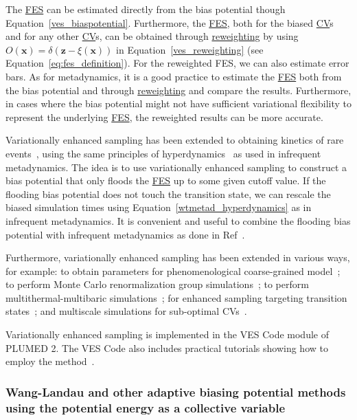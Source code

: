 \documentclass[9pt,review]{livecoms}
\newcommand{\vx}{\mathbf{x}}
\newcommand{\vz}{\mathbf{z}}
\begin{document}
The \hyperlink{ref:FES} {FES} can be estimated directly from the bias potential though Equation~\ref{ves_biaspotential}. Furthermore, the \hyperlink{ref:FES} {FES}, both for the biased \hyperlink{ref:CV} {CV}s and for any other \hyperlink{ref:CV} {CV}s, can be obtained through \hyperlink{ref:Reweighting} {reweighting} by using $O(\vx) = \delta(\vz-\xi(\vx))$ in Equation~\ref{ves_reweighting} (see Equation~\ref{eq:fes_definition}). For the reweighted FES, we can also estimate error bars. As for metadynamics, it is a good practice to estimate the \hyperlink{ref:FES} {FES} both from the bias potential and through \hyperlink{ref:Reweighting} {reweighting} and compare the results. Furthermore, in cases where the bias potential might not have sufficient variational flexibility to represent the underlying \hyperlink{ref:FES} {FES}, the reweighted results can be more accurate.


Variationally enhanced sampling has been extended to obtaining kinetics of rare events~\cite{McCarty-PRL-2015}, using the same principles of hyperdynamics~\cite{Voter-PRL-1997} as used in infrequent metadynamics. The idea is to use variationally enhanced sampling to construct a bias potential that only floods the \hyperlink{ref:FES} {FES} up to some given cutoff value. If the flooding bias potential does not touch the transition state, we can rescale the biased simulation times using Equation~\ref{wtmetad_hyperdynamics} as in infrequent metadynamics. It is convenient and useful to combine the flooding bias potential with infrequent metadynamics as done in Ref~\cite{Palazzesi2017_JPCL}.

Furthermore, variationally enhanced sampling has been extended in various ways, for example:
to obtain parameters for phenomenological coarse-grained model~\cite{Invernizzi-PNAS-2017};
to perform Monte Carlo renormalization group simulations~\cite{Wu_VES-RGMC_PRL2017,Wu_VES-RGMC_PRE2019,Wu_VES-RGMC_PRL2020};
to perform multithermal-multibaric simulations~\cite{Piaggi_MultiVES_2019};
for enhanced sampling targeting transition states~\cite{Debnath_VES-TS_2019}; and
multiscale simulations for sub-optimal CVs~\cite{Invernizzi_VES_DelteF_2019}.

Variationally enhanced sampling is implemented in the VES Code module of PLUMED 2. The VES Code also includes practical tutorials showing how to employ the method~\cite{plumed_masterclass}.



\subsubsection{Wang-Landau and other adaptive biasing potential methods using the potential energy as a collective variable}
\label{sec:abp_energy}
\end{document}
